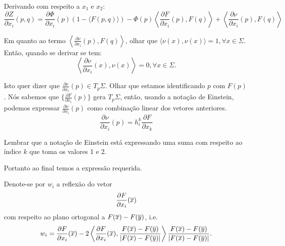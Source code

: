 

\begin{observacao}
	Derivando com respeito a $x_1$ e $x_2$:
	\begin{equation*}
		\frac{\partial Z}{\partial x_i} (p, q) =  \frac{\partial \Phi}{\partial x_i}(p) (1 - \langle F(p, q) \rangle) -  \Phi(p) \left\langle \frac{\partial F}{\partial x_i}(p), F(q) \right\rangle + \left\langle \frac{\partial \nu}{\partial x_i}(p), F(q) \right\rangle
	\end{equation*}
	
	Em quanto ao termo $ \left\langle \frac{\partial \nu}{\partial x_i}(p), F(q) \right\rangle $, olhar que $\langle \nu(x), \nu(x) \rangle=1, \forall x \in \Sigma$. Então, quando se derivar se tem:
	\begin{equation*}
		\left\langle \frac{\partial \nu}{\partial x_i}(x), \nu(x) \right\rangle = 0, \forall x \in \Sigma.
	\end{equation*}
	
	Isto quer dizer que $\frac{\partial \nu}{\partial x_i}(p) \in T_{p} \Sigma$. Olhar que estamos identificando $p$ com $F(p)$. Nós sabemos que $\{ \frac{\partial F}{\partial x_i}(p) \}$ gera $T_{p} \Sigma$, então, usando a notação de Einstein, podemos expressar $\frac{\partial \nu}{\partial x_i}(p)$ como combinação linear dos vetores anteriores.
	\begin{equation}\label{der_nu_x}
		\frac{\partial \nu}{\partial x_i} (p) = h_i^k \frac{\partial F}{\partial x_k}
	\end{equation}
	
	Lembrar que a notação de Einstein está expressando uma suma com respeito ao índice $k$ que toma os valores 1 e 2.
	
	Portanto ao final temos a expressão requerida.
\end{observacao}


\begin{definicao}
	Denote-se por $w_i$ a reflexão do vetor
	\begin{equation*}
		\frac{\partial F}{\partial x_i}(\overline{x})
	\end{equation*}
	com respeito ao plano ortogonal a $F(\overline{x}) - F(\overline{y})$, i.e.
	\begin{equation*}
		w_i = \frac{\partial F}{\partial x_i}(\overline{x}) - 2 \left\langle \frac{\partial F}{\partial x_i}(\overline{x}), \frac{F(\overline{x}) - F(\overline{y})}{|F(\overline{x}) - F(\overline{y})|} \right\rangle \frac{F(\overline{x}) - F(\overline{y})}{|F(\overline{x}) - F(\overline{y})|}.
	\end{equation*}
	
	
\end{definicao}

